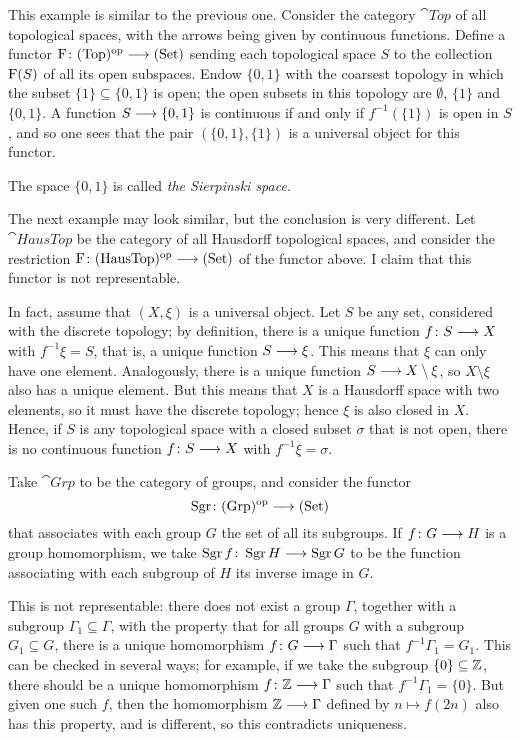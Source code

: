 \begin{2   CONTRAVARIANT FUNCTORS}
\begin{2.1 Yoneda Lemma}
\begin{enumeratei}
\item\label{ex:rep-opensubsets} This example is similar to the previous one. Consider the category $\cat{Top}$ of all topological spaces, with the arrows being given by continuous functions. Define a functor $\rF \colon \cat{Top}\op \arr \catset$ sending each topological space $S$ to the collection $\mathrm{F}(S)$ of all its open subspaces. Endow $\{0,1\}$ with the coarsest topology in which the subset $\{1\} \subseteq \{0,1\}$ is open; the open subsets in this topology are $\emptyset$, $\{1\}$ and $\{0,1\}$. A function $S \arr \{0,1\}$ is continuous if and only if $f^{-1}(\{1\})$ is open in $S$, and so one sees that the pair $(\{0,1\}, \{1\})$ is a universal object for this functor.

The space $\{0,1\}$ is called \emph{the Sierpinski space}.

\item\label{ex:notrep-opensubsets} The next example may look similar, but the conclusion is very different. Let $\cat{HausTop}$ be the category of all Hausdorff topological spaces, and consider the restriction  $\rF\colon \cat{HausTop}\op \arr \catset$ of the functor above. I claim that this functor is not representable. 

In fact, assume that $(X, \xi)$ is a universal object. Let $S$ be any set, considered with the discrete topology; by definition, there is a unique function $f \colon S \arr X$ with $f^{-1} \xi = S$, that is, a unique function $S \arr \xi$. This means that $\xi$ can only have one element. Analogously, there is a unique function $S \arr X \setminus \xi$, so $X \setminus \xi$ also has a unique element. But this means that $X$ is a Hausdorff space with two elements, so it  must have the discrete topology; hence $\xi$ is also closed in $X$. Hence, if $S$ is any topological space with a closed subset $\sigma$ that is not open, there is no continuous function $f\colon S \arr X$ with $f^{-1}{\xi} = \sigma$.

\item Take $\cat{Grp}$ to be the category of groups, and consider the functor 
   \[
   \operatorname{Sgr} \colon \cat{Grp}\op \arr \catset
   \]
that associates with each group $G$ the set of all its subgroups. If $f \colon G \arr H$ is a group homomorphism, we take $\operatorname{Sgr} f \colon \operatorname{Sgr} H \arr \operatorname{Sgr} G$ to be the function associating with each subgroup of $H$ its inverse image in $G$.

This is not representable: there does not exist a group $\Gamma$, together with a subgroup $\Gamma_1 \subseteq \Gamma$, with the property that for all groups $G$ with a subgroup $G_1 \subseteq G$, there is a unique homomorphism $f \colon G \arr \Gamma$ such that $f^{-1} \Gamma_1 = G_1$. This can be checked in several ways; for example, if we take the subgroup $\{0\} \subseteq \mathbb{Z}$, there should be a unique homomorphism $f \colon \ZZ \arr \Gamma$ such that $f ^{-1} \Gamma_1 = \{0\}$. But given one such $f$, then the homomorphism $\ZZ \arr \Gamma$ defined by $n \mapsto f(2n)$ also has this property, and is different, so this contradicts uniqueness.


\end{enumeratei}
\end{2.1 Yoneda Lemma}
\end{2   CONTRAVARIANT FUNCTORS}
